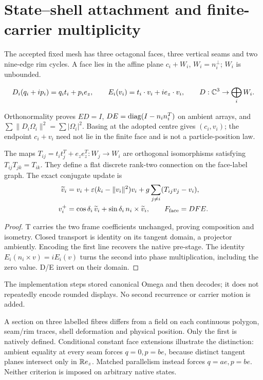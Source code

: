 \section{State--shell attachment and finite-carrier multiplicity}\label{sec:attachment}
The accepted fixed mesh has three octagonal faces, three vertical seams and two nine-edge rim cycles. A face lies in the affine plane \(c_i+W_i\), \(W_i=n_i^\perp\); \(W_i\) is unbounded.

\begin{definition}
\begin{equation}
D_i(q_i+ip_i)=q_it_i+p_ie_z,\qquad
E_i(v_i)=t_i\cdot v_i+i e_z\cdot v_i,\qquad
D:\mathbb C^3\to\bigoplus_iW_i.\label{eq:decoder}
\end{equation}
\end{definition}
Orthonormality proves \(ED=I\), \(DE=\operatorname{diag}(I-n_in_i^T)\) on ambient arrays, and \(\sum\|D_i\Omega_i\|^2=\sum|\Omega_i|^2\). Basing at the adopted centre gives \((c_i,v_i)\); the endpoint \(c_i+v_i\) need not lie in the finite face and is not a particle-position law.

\begin{proposition}
The maps \(T_{ij}=t_it_j^T+e_ze_z^T:W_j\to W_i\) are orthogonal isomorphisms satisfying \(T_{ij}T_{jk}=T_{ik}\). They define a flat discrete rank-two connection on the face-label graph. The exact conjugate update is
\begin{align}
\widetilde v_i&=v_i+\varepsilon(k_i-\|v_i\|^2)v_i
 +g\sum_{j\ne i}(T_{ij}v_j-v_i),\\
v_i^+&=\cos\delta_i\,\widetilde v_i+
 \sin\delta_i\,n_i\times\widetilde v_i,\qquad F_{\rm face}=DFE.\label{eq:faceupdate}
\end{align}
\end{proposition}
\begin{proof}
T carries the two frame coefficients unchanged, proving composition and isometry. Closed transport is identity on its tangent domain, a projector ambiently. Encoding the first line recovers the native pre-stage. The identity \(E_i(n_i\times v)=iE_i(v)\) turns the second into phase multiplication, including the zero value. D/E invert on their domain.
\end{proof}
The implementation steps stored canonical Omega and then decodes; it does not repeatedly encode rounded displays. No second recurrence or carrier motion is added.

A section on three labelled fibres differs from a field on each continuous polygon, seam/rim traces, shell deformation and physical position. Only the first is natively defined. Conditional constant face extensions illustrate the distinction: ambient equality at every seam forces \(q=0,p=be\), because distinct tangent planes intersect only in \(\mathbb R e_z\). Matched parallelism instead forces \(q=ae,p=be\). Neither criterion is imposed on arbitrary native states.

